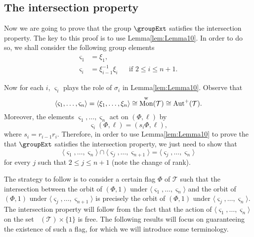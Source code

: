 \documentclass[final]{amsart}
\theoremstyle{plain}
\theoremstyle{definition}
\theoremstyle{remark}
\numberwithin{equation}{section}
\renewcommand{\leq}{\leqslant} \renewcommand{\geq}{\geqslant}
\renewcommand{\{}{\lbrace}
\renewcommand{\}}{\rbrace}
\newcommand{\cT}{\mathcal{T}}
\DeclareMathOperator{\Fw}{\mathcal{F}^{w}}
\DeclareMathOperator{\mon}{Mon}
\DeclareMathOperator{\monw}{\mon^{w}}
\newcommand{\te}{\xi}
\newcommand{\es}{\varsigma}
\begin{document}
 \subsection{The intersection property} \label{sec:IP}
Now we are going to prove that the group $\groupExt$  satisfies the intersection property. 
The key to this proof is to use Lemma\nobreakspace \ref {lem:Lemma10}. 
In order to do so, we shall consider the following group elements
\begin{equation}\label{eq:gensEs}
\begin{aligned}
  \es_{1} &= \te_{1}, &&\\
  \es_{i} &= \te_{i-1}^{-1} \te_{i} && \text{if } 2 \leq i \leq n+1.
\end{aligned}
\end{equation}

Now for each $i$, $\es_{i}$ plays the role of $\sigma_{i}$ in Lemma\nobreakspace \ref {lem:Lemma10}.
Observe that
\begin{equation}
\langle \es_{1}, \dots, \es_{n} \rangle = \langle \te_{1}, \dots, \te_{n} \rangle \cong \monw(\cT) \cong \autp(\cT).
\end{equation}
Moreover, the elements $\es_{1}, \dots, \es_{n}$ act on $(\Phi, \ell)$ by \[\es_{i}(\Phi,\ell) = (s_{i} \Phi, \ell),\] where $s_{i} = r_{i-1}r_{i}$. 
Therefore, in order to use Lemma\nobreakspace \ref {lem:Lemma10} to prove the that $\groupExt$ satisfies the intersection property, we just need to show that
\begin{equation}
  \langle \es_{1}, \dots, \es_{n} \rangle \cap \langle \es_{j}, \dots, \es_{n+1} \rangle = \langle \es_{j}, \dots, \es_{n}\rangle
\end{equation}
for every $j$ such that $2 \leq j \leq n+1$ (note the change of rank).

The strategy to follow is to consider a certain flag $\Phi$ of  $\cT$ such that the intersection between the orbit of $(\Phi,1)$ under $\langle \es_{1}, \dots, \es_{n} \rangle $ and the orbit of $(\Phi,1)$ under $\langle \es_{j}, \dots, \es_{n+1} \rangle$ is precisely the orbit of $(\Phi,1)$ under  $\langle \es_{j}, \dots, \es_{n} \rangle$. The intersection property will follow from the fact that the action of $\langle \es_{1}, \dots, \es_{n} \rangle$ on the set $\Fw(\cT) \times \{1\}$ is free. The following results will focus on guaranteeing  the existence of such a flag, for which we will introduce some terminology. 
\end{document}
